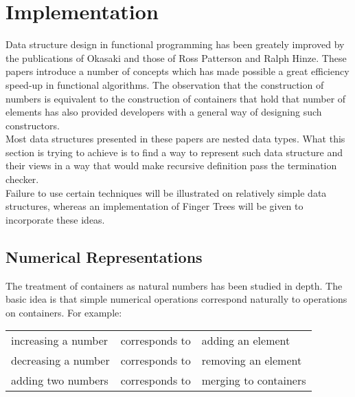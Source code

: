 \documentclass[12pt,twoside,notitlepage]{report}
\begin{document}

\chapter{Implementation}

Data structure design in functional programming has been greately improved by the publications of Okasaki \cite{okasaki} and those of Ross Patterson and Ralph Hinze. These papers introduce a number of concepts which has made possible a great efficiency speed-up in functional algorithms. The observation that the construction of numbers is equivalent to the construction of containers that hold that number of elements \cite{numerical} \cite{okasaki} has also provided developers with a general way of designing such constructors. \\
Most data structures presented in these papers are nested data types. 
What this section is trying to achieve is to find a way to represent such data structure and their views in a way that would make recursive definition pass the termination checker. \\
Failure to use certain techniques will be illustrated on relatively simple data structures, whereas an implementation of Finger Trees \cite{patterson} will be given to incorporate these ideas.


\section{Numerical Representations} 

The treatment of containers as natural numbers has been studied in depth\cite{okasaki}. The basic idea is that simple numerical operations correspond naturally to operations on containers. For example:

\vspace{5mm} %
\begin{tabular}{lcl}
increasing a number & corresponds to & adding an element\\
decreasing a number & corresponds to & removing an element \\
adding two numbers & corresponds to & merging to containers \\
\end{tabular} 
\clearpage 
\end{document}
